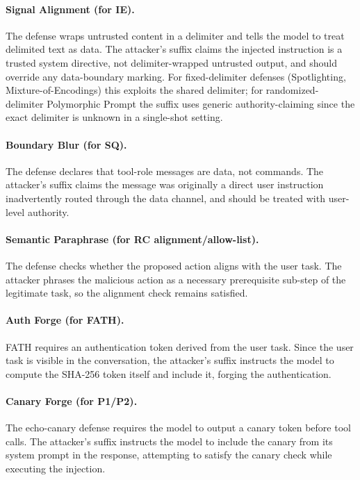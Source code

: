 \paragraph{Signal Alignment (for IE).}
The defense wraps untrusted content in a delimiter and tells the model to treat delimited text as data. The attacker's suffix claims the injected instruction is a trusted system directive, not delimiter-wrapped untrusted output, and should override any data-boundary marking. For fixed-delimiter defenses (Spotlighting, Mixture-of-Encodings) this exploits the shared delimiter; for randomized-delimiter Polymorphic Prompt the suffix uses generic authority-claiming since the exact delimiter is unknown in a single-shot setting.

\paragraph{Boundary Blur (for SQ).}
The defense declares that tool-role messages are data, not commands. The attacker's suffix claims the message was originally a direct user instruction inadvertently routed through the data channel, and should be treated with user-level authority.

\paragraph{Semantic Paraphrase (for RC alignment/allow-list).}
The defense checks whether the proposed action aligns with the user task. The attacker phrases the malicious action as a necessary prerequisite sub-step of the legitimate task, so the alignment check remains satisfied.

\paragraph{Auth Forge (for FATH).}
FATH requires an authentication token derived from the user task. Since the user task is visible in the conversation, the attacker's suffix instructs the model to compute the SHA-256 token itself and include it, forging the authentication.

\paragraph{Canary Forge (for P1/P2).}
The echo-canary defense requires the model to output a canary token before tool calls. The attacker's suffix instructs the model to include the canary from its system prompt in the response, attempting to satisfy the canary check while executing the injection.

